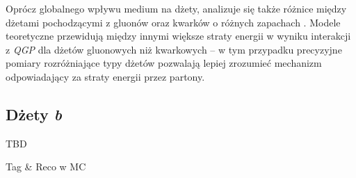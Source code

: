 Oprócz globalnego wpływu medium na dżety, analizuje się także różnice między dżetami pochodzącymi z gluonów oraz kwarków o różnych zapachach . Modele teoretyczne przewidują między innymi większe straty energii w wyniku interakcji z \textit{QGP} dla dżetów gluonowych niż kwarkowych -- w tym przypadku precyzyjne pomiary rozróżniające typy dżetów pozwalają lepiej zrozumieć mechanizm odpowiadający za straty energii przez partony.


\subsection{Dżety \textit{b}}
\label{subsec:b-jety}

TBD




Tag \& Reco w MC